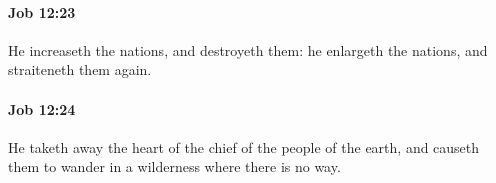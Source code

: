 		\paragraph{Job 12:23} %
			\label{JOB-12-23}

			He increaseth the nations, and destroyeth them: he enlargeth the nations, and straiteneth them again.


		\paragraph{Job 12:24} %
			\label{JOB-12-24}

			He taketh away the heart of the chief of the people of the earth, and causeth them to wander in a wilderness where there is no way.


